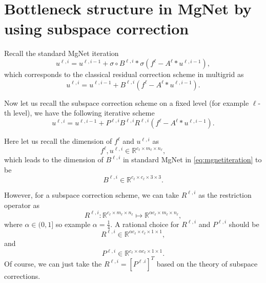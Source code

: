 \section{Bottleneck structure in MgNet by using subspace correction}
Recall the standard MgNet iteration
\begin{equation}\label{eq:mgnetiteration}
u^{\ell,i} = u^{\ell,i-1} + \sigma \circ B^{\ell,i} \ast \sigma ({f^\ell -  A^{\ell} \ast u^{\ell,i-1}}),
\end{equation}
which corresponds to the classical residual correction scheme in multigrid as
\begin{equation}\label{key}
u^{\ell,i} = u^{\ell,i-1} + B^{\ell,i} ({f^\ell -  A^{\ell} \ast u^{\ell,i-1}}).
\end{equation}

Now let us recall the subspace correction scheme on a fixed level (for example $\ell$-th level),
we have the following iterative scheme 
\begin{equation}\label{eq:bottleneckmgnet}
u^{\ell,i} = u^{\ell,i-1} + P^{\ell,i} B^{\ell,i} R^{\ell,i}({f^\ell -  A^{\ell} \ast u^{\ell,i-1}}).
\end{equation}

Here let us recall the dimension of $f^\ell$ and $u^{\ell,i}$ as
\begin{equation}\label{key}
f^\ell, u^{\ell,i} \in \mathbb{R}^{c_\ell \times m_\ell \times n_\ell },
\end{equation}
which leads to the dimension of $B^{\ell,i}$ in standard MgNet in \eqref{eq:mgnetiteration} to be
\begin{equation}\label{key}
B^{\ell,i} \in \mathbb{R}^{c_\ell \times c_\ell \times 3 \times 3}.
\end{equation}



However, for a subspace correction scheme, we can take $R^{\ell,i}$ as the restriction operator as
\begin{equation}\label{key}
R^{\ell,i}: \mathbb{R}^{c_\ell \times m_\ell \times n_\ell } \mapsto \mathbb{R}^{ \alpha c_\ell \times m_\ell \times n_\ell },
\end{equation}
where $\alpha \in (0,1]$ so example $\alpha = \frac{1}{4}$. 
A rational choice for $R^{\ell,i}$ and $P^{\ell,i}$ should be
\begin{equation}\label{key}
R^{\ell,i} \in \mathbb{R}^{\alpha c_\ell \times c_\ell \times 1 \times 1},
\end{equation}
and 
\begin{equation}\label{key}
P^{\ell,i} \in \mathbb{R}^{ c_\ell \times \alpha c_\ell \times 1 \times 1}.
\end{equation}
Of course, we can just take the $R^{\ell,i} = [P^{\ell.i}]^T$ based on the 
theory of subspace corrections. 

